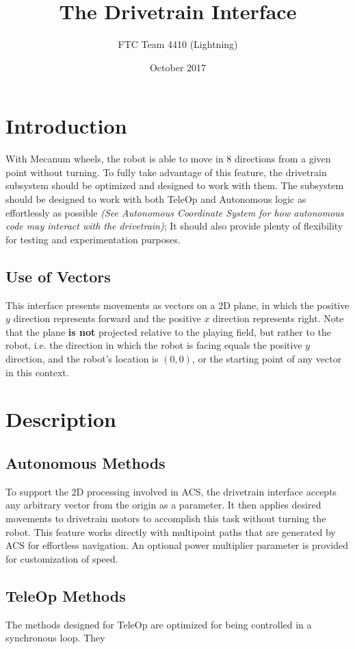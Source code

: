 \documentclass{article}
\begin{document}
\title{The Drivetrain Interface}
\author{FTC Team 4410 (Lightning)}
\date{October 2017}
\maketitle

\section{Introduction}
With Mecanum wheels, the robot is able to move in 8 directions from a given point without turning. To fully take advantage of this feature, the drivetrain subsystem should be optimized and designed to work with them. The subsystem should be designed to work with both TeleOp and Autonomous logic as effortlessly as possible \emph{(See Autonomous Coordinate System for how autonomous code may interact with the drivetrain)}; It should also provide plenty of flexibility for testing and experimentation purposes.

\subsection{Use of Vectors}
This interface presents movements as vectors on a 2D plane, in which the positive $y$ direction represents forward and the positive $x$ direction represents right. Note that the plane \textbf{is not} projected relative to the playing field, but rather to the robot, i.e. the direction in which the robot is facing equals the positive $y$ direction, and the robot's location is $(0,0)$, or the starting point of any vector in this context.

\section{Description}

\subsection{Autonomous Methods}
To support the 2D processing involved in ACS, the drivetrain interface accepts any arbitrary vector from the origin as a parameter. It then applies desired movements to drivetrain motors to accomplish this task without turning the robot. This feature works directly with multipoint paths that are generated by ACS for effortless navigation. An optional power multiplier parameter is provided for customization of speed.

\subsection{TeleOp Methods}
The methods designed for TeleOp are optimized for being controlled in a synchronous loop. They
\end{document}
